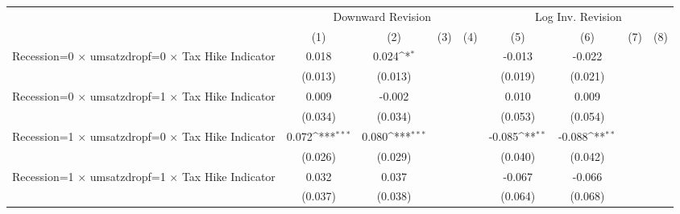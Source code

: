 {
\def\sym#1{\ifmmode^{#1}\else\(^{#1}\)\fi}
\begin{tabular}{l*{8}{c}}
\toprule
                    &\multicolumn{4}{c}{Downward Revision}                                                  &\multicolumn{4}{c}{Log Inv. Revision}                                                  \\\cmidrule(lr){2-5}\cmidrule(lr){6-9}
                    &\multicolumn{1}{c}{(1)}         &\multicolumn{1}{c}{(2)}         &\multicolumn{1}{c}{(3)}         &\multicolumn{1}{c}{(4)}         &\multicolumn{1}{c}{(5)}         &\multicolumn{1}{c}{(6)}         &\multicolumn{1}{c}{(7)}         &\multicolumn{1}{c}{(8)}         \\
\midrule
Recession=0 $\times$ umsatzdropf=0 $\times$ Tax Hike Indicator&       0.018         &       0.024\sym{*}  &                     &                     &      -0.013         &      -0.022         &                     &                     \\
                    &     (0.013)         &     (0.013)         &                     &                     &     (0.019)         &     (0.021)         &                     &                     \\
Recession=0 $\times$ umsatzdropf=1 $\times$ Tax Hike Indicator&       0.009         &      -0.002         &                     &                     &       0.010         &       0.009         &                     &                     \\
                    &     (0.034)         &     (0.034)         &                     &                     &     (0.053)         &     (0.054)         &                     &                     \\
Recession=1 $\times$ umsatzdropf=0 $\times$ Tax Hike Indicator&       0.072\sym{***}&       0.080\sym{***}&                     &                     &      -0.085\sym{**} &      -0.088\sym{**} &                     &                     \\
                    &     (0.026)         &     (0.029)         &                     &                     &     (0.040)         &     (0.042)         &                     &                     \\
Recession=1 $\times$ umsatzdropf=1 $\times$ Tax Hike Indicator&       0.032         &       0.037         &                     &                     &      -0.067         &      -0.066         &                     &                     \\
                    &     (0.037)         &     (0.038)         &                     &                     &     (0.064)         &     (0.068)         &                     &                     \\

\end{tabular}}
